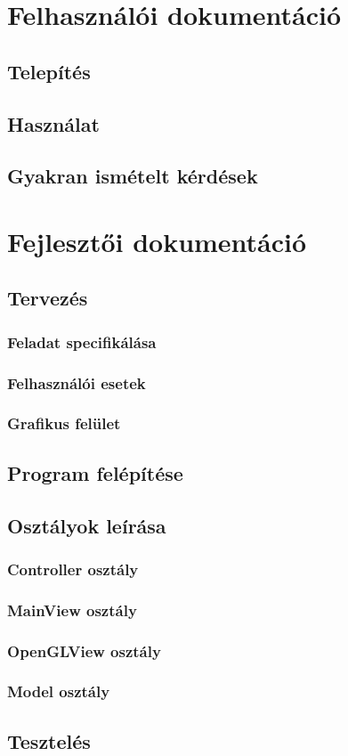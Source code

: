 \documentclass{elteikthesis}
\begin{document}
\chapter{Felhasználói dokumentáció}
\section{Telepítés}
\section{Használat}
\section{Gyakran ismételt kérdések}

\chapter{Fejlesztői dokumentáció}
\section{Tervezés}
\subsection{Feladat specifikálása}
\subsection{Felhasználói esetek}
\subsection{Grafikus felület}
\section{Program felépítése}
\section{Osztályok leírása}
\subsection{Controller osztály}
\subsection{MainView osztály}
\subsection{OpenGLView osztály}
\subsection{Model osztály}
\section{Tesztelés}
\end{document}
